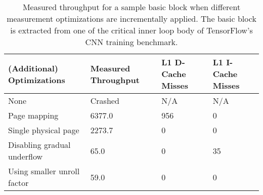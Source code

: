 \begin{table}
\begin{tabular}{
|p{}|p{}|p{}|p{}|}
\hline (Additional) Optimizations &
Measured Throughput &
L1 D-Cache Misses &
L1 I-Cache Misses \\

\hline
None & Crashed & N/A & N/A \\

\hline
Page mapping & 6377.0 & 956 & 0 \\

\hline
Single physical page & 2273.7 & 0 & 0 \\

\hline
Disabling gradual underflow & 65.0 & 0 & 35 \\

\hline
Using smaller unroll factor & 59.0 & 0 & 0\\

\hline
\end{tabular}
\\
\caption{Measured throughput for a sample basic block when
different measurement optimizations are incrementally applied.
The basic block is extracted from one of the critical 
inner loop body of TensorFlow\cite{tensorflow}'s CNN training benchmark.}
\label{tab:ablation}
\end{table}